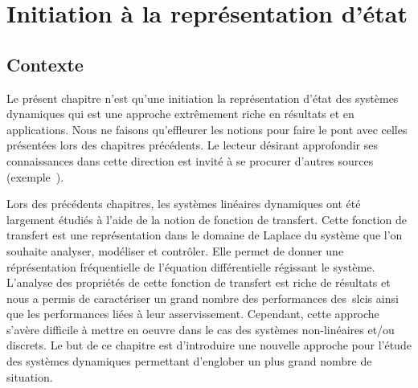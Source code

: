 \chapter[Représentation d'état]
{Initiation à la représentation d'état\label{chap-repreEtat}}
\minitoc
\newpage
\section{Contexte}
Le présent chapitre n'est qu'une initiation la représentation d'état des systèmes
dynamiques qui est une approche extrêmement riche
en résultats et en applications. Nous ne faisons qu'effleurer les notions pour
faire le pont avec celles présentées lors des chapitres précédents. 
Le lecteur désirant approfondir ses connaissances dans cette direction est 
invité à se procurer d'autres sources (exemple~\cite{Bachelier}). 

Lors des précédents chapitres, les systèmes linéaires dynamiques ont été 
largement étudiés à l'aide de la notion de fonction de transfert. Cette fonction
de transfert est une représentation dans le domaine de Laplace du système que
l'on souhaite analyser, modéliser et contrôler. Elle permet de donner
une réprésentation fréquentielle de l'équation différentielle régissant le 
système. L'analyse des propriétés de cette fonction de transfert est riche de
résultats et nous a permis de caractériser un grand nombre des performances
des~\glspl{slci} ainsi que les performances liées à leur asservissement. 
Cependant, cette approche s'avère difficile à mettre en oeuvre dans le cas 
des systèmes non-linéaires et/ou discrets. Le but de ce chapitre est 
d'introduire une nouvelle approche  pour l'étude des systèmes dynamiques 
permettant d'englober un plus grand nombre de situation. 

